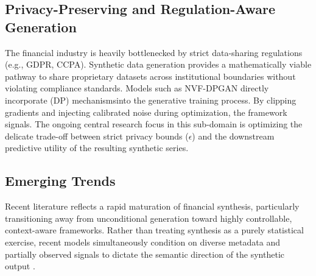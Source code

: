 \subsection{Privacy-Preserving and Regulation-Aware Generation}

The financial industry is heavily bottlenecked by strict data-sharing regulations (e.g., GDPR, CCPA). Synthetic data generation provides a mathematically viable pathway to share proprietary datasets across institutional boundaries without violating compliance standards. Models such as NVF-DPGAN \citep{NVF-DPGAN} directly incorporate (DP) mechanismsinto the generative training process. By clipping gradients and injecting calibrated noise during optimization, the framework signals. The ongoing central research focus in this sub-domain is optimizing the delicate trade-off between strict privacy bounds ($\epsilon$) and the downstream predictive utility of the resulting synthetic series.

\subsection{Emerging Trends}

Recent literature reflects a rapid maturation of financial synthesis, particularly transitioning away from unconditional generation toward highly controllable, context-aware frameworks. Rather than treating synthesis as a purely statistical exercise, recent models simultaneously condition on diverse metadata and partially observed signals to dictate the semantic direction of the synthetic output \citep{gholamrezaei2023conditioning}.

